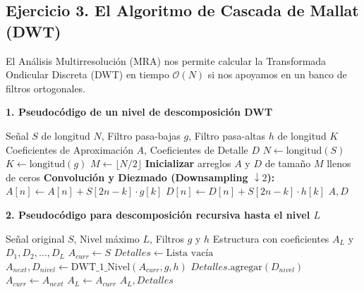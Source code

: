 \subsection*{Ejercicio 3. El Algoritmo de Cascada de Mallat (DWT)} %
\noindent El Análisis Multirresolución (MRA) nos permite calcular la Transformada Ondicular Discreta (DWT) en tiempo $\mathcal{O}(N)$ si nos apoyamos en un banco de filtros ortogonales. %

\vspace{0.5cm}
\noindent \textbf{1. Pseudocódigo de un nivel de descomposición DWT} %

\begin{algorithm}[H]
\caption{Descomposición DWT - 1 Nivel}\label{alg:dwt1}
\begin{algorithmic}[1]
\Require Señal $S$ de longitud $N$, Filtro pasa-bajas $g$, Filtro pasa-altas $h$ de longitud $K$
\Ensure Coeficientes de Aproximación $A$, Coeficientes de Detalle $D$
\State $N \gets \text{longitud}(S)$
\State $K \gets \text{longitud}(g)$ 
\State $M \gets \lfloor N / 2 \rfloor$ 
\State \textbf{Inicializar} arreglos $A$ y $D$ de tamaño $M$ llenos de ceros
\State \textbf{Convolución y Diezmado (Downsampling $\downarrow 2$):}
         
            \State $A[n] \gets A[n] + S[2n - k] \cdot g[k]$
            \State $D[n] \gets D[n] + S[2n - k] \cdot h[k]$
        \EndIf
    \EndFor
\EndFor
\State \Return $A, D$
\end{algorithmic}
\end{algorithm}

\vspace{0.5cm}
\noindent \textbf{2. Pseudocódigo para descomposición recursiva hasta el nivel $L$} %

\begin{algorithm}[H]
\caption{Descomposición DWT Recursiva (Nivel $L$)}\label{alg:dwtL}
\begin{algorithmic}[1]
\Require Señal original $S$, Nivel máximo $L$, Filtros $g$ y $h$
\Ensure Estructura con coeficientes $A_L$ y $D_1, D_2, \dots, D_L$
\State $A_{curr} \gets S$ 
\State $Detalles \gets \text{Lista vacía}$
    \State $A_{next}, D_{nivel} \gets \text{DWT\_1\_Nivel}(A_{curr}, g, h)$
    \State $Detalles.\text{agregar}(D_{nivel})$
    \State $A_{curr} \gets A_{next}$ 
\EndFor
\State $A_L \gets A_{curr}$
\State \Return $A_L, Detalles$
\end{algorithmic}
\end{algorithm}

\vspace{1cm}
